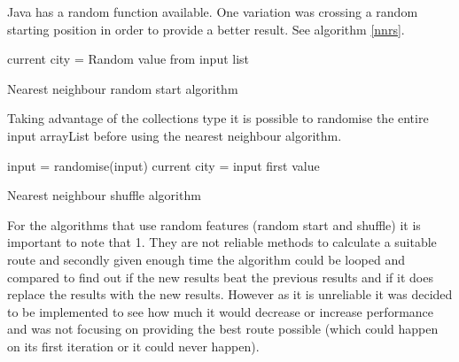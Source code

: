 \documentclass[conference,backref=page]{acmsiggraph}
\begin{document}
Java has a random function available. One variation was crossing a random starting position in order to provide a better result. See algorithm \ref{nnrs}.


	\begin{algorithm}[h]	
		current city = Random value from input list\\
		\caption{Nearest neighbour random start algorithm}
		\label{nnrs}
	\end{algorithm}	
Taking advantage of the collections type it is possible to 	randomise the entire input arrayList before using the nearest neighbour algorithm.
		

\begin{algorithm}[h]	
	input = randomise(input)
	current city = input first value\\
	\caption{Nearest neighbour shuffle algorithm}
\end{algorithm}

For the algorithms that use random features (random start and shuffle) it is important to note that 1. They are not reliable methods to calculate a suitable route and secondly given enough time the algorithm could be looped and compared to find out if the new results beat the previous results and if it does replace the results with the new results. However as it is unreliable it was decided to be implemented to see how much it would decrease or increase performance and was not focusing on providing the best route possible (which could happen on its first iteration or it could never happen). 
\end{document}

